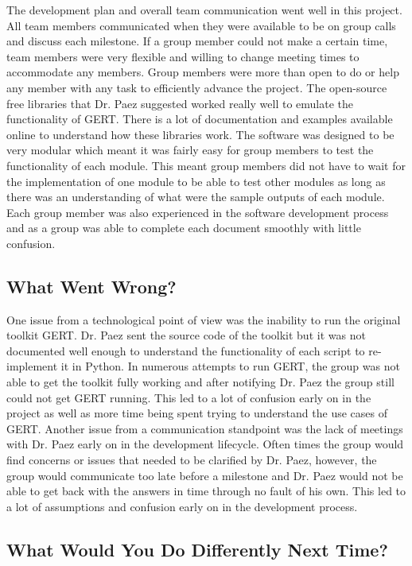 \documentclass{article}
\begin{document}
The development plan and overall team communication went well in this project. All team members communicated when they were available to be on group calls and discuss each milestone. If a group member could not make a certain time, team members were very flexible and willing to change meeting times to accommodate any members. Group members were more than open to do or help any member with any task to efficiently advance the project. The open-source free libraries that Dr. Paez suggested worked really well to emulate the functionality of GERT. There is a lot of documentation and examples available online to understand how these libraries work. The software was designed to be very modular which meant it was fairly easy for group members to test the functionality of each module. This meant group members did not have to wait for the implementation of one module to be able to test other modules as long as there was an understanding of what were the sample outputs of each module. Each group member was also experienced in the software development process and as a group was able to complete each document smoothly with little confusion.

\subsection{What Went Wrong?}


One issue from a technological point of view was the inability to run the original toolkit GERT. Dr. Paez sent the source code of the toolkit but it was not documented well enough to understand the functionality of each script to re-implement it in Python. In numerous attempts to run GERT, the group was not able to get the toolkit fully working and after notifying Dr. Paez the group still could not get GERT running. This led to a lot of confusion early on in the project as well as more time being spent trying to understand the use cases of GERT. Another issue from a communication standpoint was the lack of meetings with Dr. Paez early on in the development lifecycle. Often times the group would find concerns or issues that needed to be clarified by Dr. Paez, however, the group would communicate too late before a milestone and Dr. Paez would not be able to get back with the answers in time through no fault of his own. This led to a lot of assumptions and confusion early on in the development process. 

\subsection{What Would You Do Differently Next Time?}
\end{document}
